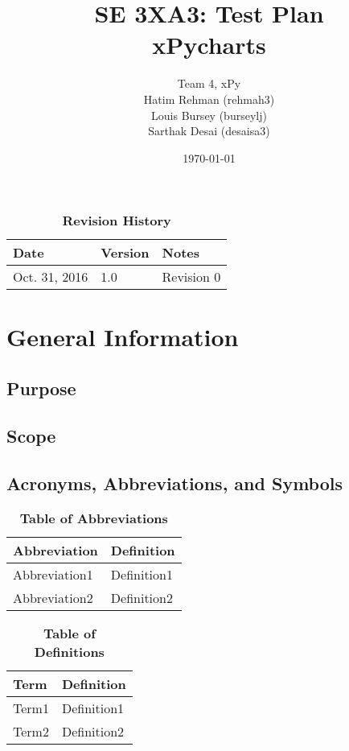 \documentclass[12pt, titlepage]{article}
\title{SE 3XA3: Test Plan\\xPycharts}
\author{Team 4, xPy
		\\ Hatim Rehman (rehmah3)
		\\ Louis Bursey (burseylj)
		\\ Sarthak Desai (desaisa3)
}
\date{\today}
\begin{document}
\maketitle
{}
\tableofcontents
\listoftables
\listoffigures
\begin{table}[bp]
\caption{\bf Revision History}
\begin{tabularx}{\textwidth}{p{3cm}p{2cm}X}
\toprule {\bf Date} & {\bf Version} & {\bf Notes}\\
\midrule
Oct. 31, 2016 & 1.0 & Revision 0\\
\bottomrule
\end{tabularx}
\end{table}
\newpage
{}
\section{General Information}
\subsection{Purpose}
\subsection{Scope}
\subsection{Acronyms, Abbreviations, and Symbols}
	
\begin{table}[hbp]
\caption{\textbf{Table of Abbreviations}} \label{Table}
\begin{tabularx}{\textwidth}{p{3cm}X}
\toprule
\textbf{Abbreviation} & \textbf{Definition} \\
\midrule
Abbreviation1 & Definition1\\
Abbreviation2 & Definition2\\
\bottomrule
\end{tabularx}
\end{table}
\begin{table}[!htbp]
\caption{\textbf{Table of Definitions}} \label{Table}
\begin{tabularx}{\textwidth}{p{3cm}X}
\toprule
\textbf{Term} & \textbf{Definition}\\
\midrule
Term1 & Definition1\\
Term2 & Definition2\\
\bottomrule
\end{tabularx}
\end{table}	
\end{document}
